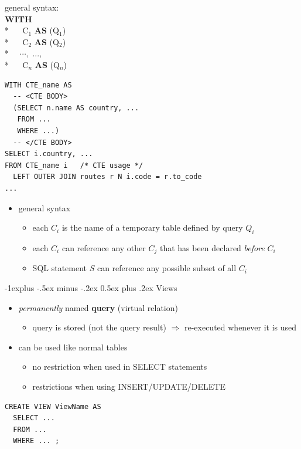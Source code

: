 \documentclass[10pt, landscape]{article}
\makeatletter
\renewcommand{\subsection}{\@startsection{subsection}{2}{0mm}%
  {-1explus -.5ex minus -.2ex}%
  {0.5ex plus .2ex}%
{\normalfont\normalsize\bfseries}}
\makeatother
\begin{document}
\begin{multicols}{3}
  \begin{minipage}[c]{0.2\linewidth}
    general syntax:
    \\ \textbf{WITH}
    \\* $\quad$ C$_1$ \textbf{AS} (Q$_1$)
    \\* $\quad$ C$_2$ \textbf{AS} (Q$_2$)
    \\* $\quad \cdots,$ ...,
    \\* $\quad$ C$_n$ \textbf{AS} (Q$_n$)
  \end{minipage}
  \begin{minipage}[c]{0.75\linewidth}
    \begin{lstlisting}[style=mySQL]
WITH CTE_name AS 
  -- <CTE BODY>
  (SELECT n.name AS country, ...
   FROM ...
   WHERE ...)
  -- </CTE BODY>
SELECT i.country, ...
FROM CTE_name i   /* CTE usage */ 
  LEFT OUTER JOIN routes r N i.code = r.to_code
...
    \end{lstlisting}
  \end{minipage}

  \begin{itemize}
    \item general syntax
      \begin{itemize}
        \item each $C_i$ is the name of a temporary table defined by query $Q_i$ 
        \item each $C_i$ can reference any other $C_j$ that has been declared \textit{before} $C_i$ 
        \item SQL statement $S$ can reference any possible subset of all $C_i$
      \end{itemize}
  \end{itemize}

  \subsection{Views}
  \begin{itemize}
    \item \textit{permanently} named \textbf{query} (virtual relation)
      \begin{itemize}
        \item query is stored (not the query result) $\Rightarrow$ re-executed whenever it is used
      \end{itemize}
    \item can be used like normal tables
      \begin{itemize}
        \item no restriction when used in SELECT statements
        \item restrictions when using INSERT/UPDATE/DELETE
      \end{itemize}
  \end{itemize}
  \begin{lstlisting}[style=mySQL]
CREATE VIEW ViewName AS
  SELECT ...
  FROM ...
  WHERE ... ;
  \end{lstlisting}


\end{multicols}
\end{document}
